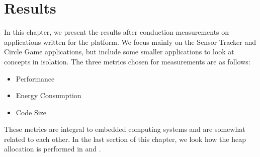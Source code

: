 
\chapter{Results}
\label{chap:results}

In this chapter, we present the results after conduction measurements on applications written for the {\rg} platform.
We focus mainly on the Sensor Tracker and Circle Game applications, but include some smaller applications to look at concepts in isolation.
The three metrics chosen for measurements are as follows:
\begin{itemize}
  \item Performance
  \item Energy Consumption
  \item Code Size
\end{itemize}
These metrics are integral to embedded computing systems and are somewhat related to each other.
In the last section of this chapter, we look how the heap allocation is performed in {\rust} and {\C}.





